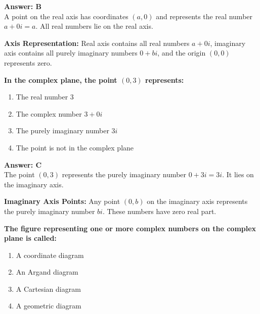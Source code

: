 \documentclass[12pt,a4paper]{article}
\begin{document}
\begin{answerstyle}
\textbf{Answer: B} \\
A point on the real axis has coordinates \( (a, 0) \) and represents the real number \( a + 0i = a \). All real numbers lie on the real axis.
\end{answerstyle}

\begin{conceptbox}
\textbf{Axis Representation:} Real axis contains all real numbers \( a + 0i \), imaginary axis contains all purely imaginary numbers \( 0 + bi \), and the origin \( (0, 0) \) represents zero.
\end{conceptbox}

\newpage
\begin{questiontitle}[MCQ 80]
\textbf{In the complex plane, the point \( (0, 3) \) represents:}
\end{questiontitle}

\begin{partbox}[Options]
\begin{enumerate}[label=\Alph*.]
    \item The real number 3
    \item The complex number \( 3 + 0i \)
    \item The purely imaginary number \( 3i \)
    \item The point is not in the complex plane
\end{enumerate}
\end{partbox}

\begin{answerstyle}
\textbf{Answer: C} \\
The point \( (0, 3) \) represents the purely imaginary number \( 0 + 3i = 3i \). It lies on the imaginary axis.
\end{answerstyle}

\begin{conceptbox}
\textbf{Imaginary Axis Points:} Any point \( (0, b) \) on the imaginary axis represents the purely imaginary number \( bi \). These numbers have zero real part.
\end{conceptbox}

\newpage
\begin{questiontitle}[MCQ 81]
\textbf{The figure representing one or more complex numbers on the complex plane is called:}
\end{questiontitle}

\begin{partbox}[Options]
\begin{enumerate}[label=\Alph*.]
    \item A coordinate diagram
    \item An Argand diagram
    \item A Cartesian diagram
    \item A geometric diagram
\end{enumerate}
\end{partbox}
\end{document}

